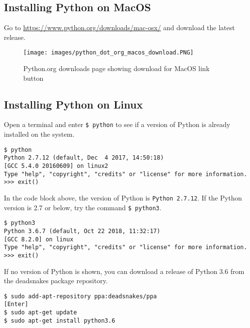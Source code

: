 \documentclass{book}
\makeatletter
\def\maxwidth{\ifdim\Gin@nat@width>\linewidth\linewidth
\else\Gin@nat@width\fi}
\let\Oldincludegraphics\includegraphics
\renewcommand{\includegraphics}[1]{\Oldincludegraphics[width=.8\maxwidth]{#1}}
\newcommand{\passthrough}[1]{#1}
\makeatother
\begin{document}
    
        \hypertarget{installing-python-on-macos}{%
\subsection{Installing Python on
MacOS}\label{installing-python-on-macos}}

Go to \url{https://www.python.org/downloads/mac-osx/} and download the
latest release.

\begin{figure}
\centering
\texttt{[image: images/python\_dot\_org\_macos\_download.PNG]}
\caption{Python.org downloads page showing download for MacOS link
button}
\end{figure}
    




    
        \hypertarget{installing-python-on-linux}{%
\subsection{Installing Python on
Linux}\label{installing-python-on-linux}}

Open a terminal and enter \passthrough{\lstinline!$ python!} to see if a
version of Python is already installed on the system.

\begin{lstlisting}
$ python
Python 2.7.12 (default, Dec  4 2017, 14:50:18)
[GCC 5.4.0 20160609] on linux2
Type "help", "copyright", "credits" or "license" for more information.
>>> exit()
\end{lstlisting}

In the code block above, the version of Python is
\passthrough{\lstinline!Python 2.7.12!}. If the Python version is 2.7 or
below, try the command \passthrough{\lstinline!$ python3!}.

\begin{lstlisting}
$ python3
Python 3.6.7 (default, Oct 22 2018, 11:32:17) 
[GCC 8.2.0] on linux
Type "help", "copyright", "credits" or "license" for more information.
>>> exit()
\end{lstlisting}

If no version of Python is shown, you can download a release of Python
3.6 from the deadsnakes package repository.

\begin{lstlisting}
$ sudo add-apt-repository ppa:deadsnakes/ppa
[Enter]
$ sudo apt-get update
$ sudo apt-get install python3.6
\end{lstlisting}
\end{document}
